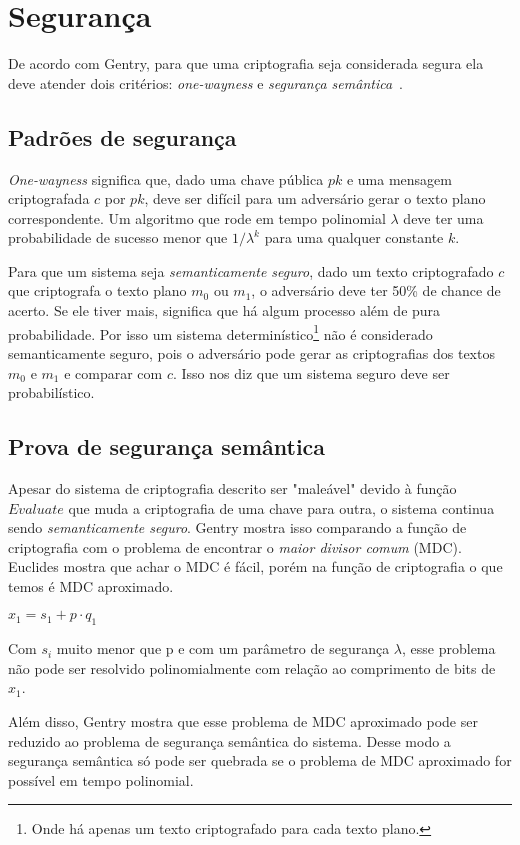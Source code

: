 \chapter{Segurança}
De acordo com Gentry, para que uma criptografia seja considerada segura ela deve atender dois critérios: \textit{one-wayness} e \textit{segurança semântica}~\cite{probability}.

\section{Padrões de segurança}
\textit{One-wayness} significa que, dado uma chave pública $pk$ e uma mensagem criptografada $c$ por $pk$, deve ser difícil para um adversário gerar o texto plano correspondente. Um algoritmo que rode em tempo polinomial $\lambda$ deve ter uma probabilidade de sucesso menor que $1/\lambda^k$ para uma qualquer constante $k$.

Para que um sistema seja \textit{semanticamente seguro}, dado um texto criptografado $c$ que criptografa o texto plano $m_0$ ou $m_1$, o adversário deve ter 50\% de chance de acerto. Se ele tiver mais, significa que há algum processo além de pura probabilidade. Por isso um sistema determinístico\footnote{Onde há apenas um texto criptografado para cada texto plano.} não é considerado semanticamente seguro, pois o adversário pode gerar as criptografias dos textos $m_0$ e $m_1$ e comparar com $c$. Isso nos diz que um sistema seguro deve ser probabilístico.

\section{Prova de segurança semântica}
Apesar do sistema de criptografia descrito ser "maleável" devido à função $Evaluate$ que muda a criptografia de uma chave para outra, o sistema continua sendo \textit{semanticamente seguro}. Gentry mostra isso comparando a função de criptografia com o problema de encontrar o \textit{maior divisor comum} (MDC). Euclides mostra que achar o MDC é fácil, porém na função de criptografia o que temos é MDC aproximado.
\begin{center}
	$x_1 = s_1 + p \cdot q_1$
\end{center}
Com $s_i$ muito menor que p e com um parâmetro de segurança $\lambda$, esse problema não pode ser resolvido polinomialmente com relação ao comprimento de bits de $x_1$.

Além disso, Gentry mostra que esse problema de MDC aproximado pode ser reduzido ao problema de segurança semântica do sistema. Desse modo a segurança semântica só pode ser quebrada se o problema de MDC aproximado for possível em tempo polinomial.

